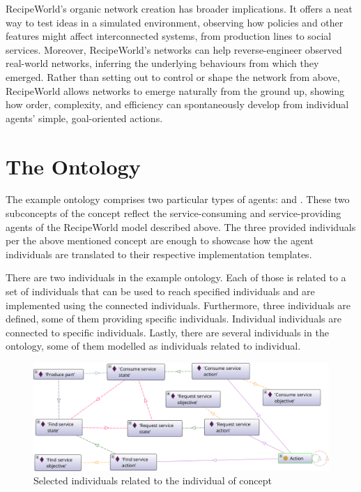RecipeWorld’s organic network creation has broader implications. It offers a neat way to test ideas in a simulated environment, observing how policies and other features might affect interconnected systems, from production lines to social services. Moreover, RecipeWorld’s networks can help reverse-engineer observed real-world networks, inferring the underlying behaviours from which they emerged. Rather than setting out to control or shape the network from above, RecipeWorld allows networks to emerge naturally from the ground up, showing how order, complexity, and efficiency can spontaneously develop from individual agents' simple, goal-oriented actions.



\section{The Ontology}

The example ontology comprises two particular types of agents:  and . These two subconcepts of the  concept reflect the service-consuming and service-providing agents of the RecipeWorld model described above. The three provided individuals per the above mentioned concept are enough to showcase how the agent individuals are translated to their respective implementation templates.

There are two  individuals in the example ontology.
%
Each of those is related to a set of 
%
individuals that can be used to reach specified  individuals and are implemented using the connected  individuals. Furthermore, three  individuals are defined, some of them providing specific  individuals. Individual  individuals
%
are connected to specific  individuals. Lastly, there are several  individuals in the ontology, some of them modelled as  individuals related to  individual.

\begin{figure}
    \centering
    \includegraphics[width=\linewidth]{Deliverables/Phase 1/Figures/Example Produce part plan.png}
    \caption{Selected individuals related to the  individual of concept }
    \label{fig: Example Produce part plan}
\end{figure}

